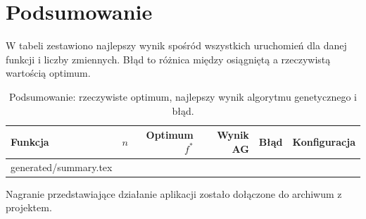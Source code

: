 \documentclass[11pt,a4paper]{article}
\makeatletter
\newcommand{\tabinput}[1]{\@@input #1 }
\makeatother
\begin{document}
\section{Podsumowanie}

W tabeli zestawiono najlepszy wynik spośród wszystkich uruchomień dla danej funkcji i liczby
zmiennych. Błąd to różnica między osiągniętą a rzeczywistą wartością optimum.

\begin{table}[H]
\centering
\small
\begin{tabular}{lrrrrl}
\toprule
Funkcja & $n$ & Optimum $f^*$ & Wynik AG & Błąd & Konfiguracja \\
\midrule
\tabinput{generated/summary.tex}
\bottomrule
\end{tabular}
\caption{Podsumowanie: rzeczywiste optimum, najlepszy wynik algorytmu genetycznego i błąd.}
\end{table}

Nagranie przedstawiające działanie aplikacji zostało dołączone
do archiwum z projektem.
\end{document}
